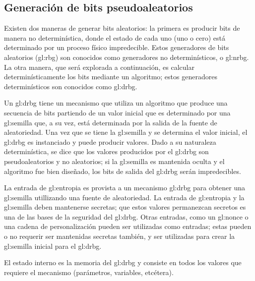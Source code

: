 %
%

\subsection{Generación de bits pseudoaleatorios}
\label{sec:generadores_pseudoaleatorios}

Existen dos maneras de generar bits aleatorios: la primera es producir bits
de manera no determinística, donde el estado de cada uno (uno o cero) está
determinado por un proceso físico impredecible. Estos generadores de bits
aleatorios (\gls{gl:rbg}) son conocidos como generadores no determinísticos, o
\gls{gl:nrbg}. La otra manera, que será explorada a continuación, es calcular
determinísticamente los bits mediante un algoritmo; estos generadores
determinísticos son conocidos como \gls{gl:drbg}.

Un \gls{gl:drbg} tiene un mecanismo que utiliza un algoritmo que produce una
secuencia de bits partiendo de un valor inicial que es determinado por una
\gls{gl:semilla} que, a su vez, está determinada por la salida de la fuente de
aleatoriedad. Una vez que se tiene la \gls{gl:semilla} y se determina el valor
inicial, el \gls{gl:drbg} es instanciado y puede producir valores. Dado a su
naturaleza determinística, se dice que los valores producidos por el
\gls{gl:drbg} son pseudoaleatorios y no aleatorios; si la \gls{gl:semilla} es
mantenida oculta y el algoritmo fue bien diseñado, los bits de salida del
\gls{gl:drbg} serán impredecibles.


La entrada de \gls{gl:entropia} es provista a un mecanismo \gls{gl:drbg} para
obtener una \gls{gl:semilla} utillizando una fuente de aleatoriedad. La entrada
de \gls{gl:entropia} y la \gls{gl:semilla} deben mantenerse secretas; que estos
valores permanezcan secretos es una de las bases de la seguridad del
\gls{gl:drbg}. Otras entradas, como un \gls{gl:nonce} o una cadena de
personalización pueden ser utilizadas como entradas; estas pueden o no requerir
ser mantenidas secretas también, y ser utilizadas para crear la \gls{gl:semilla}
inicial para el \gls{gl:drbg}.

El estado interno es la memoria del \gls{gl:drbg} y consiste en todos los
valores que requiere el mecanismo (parámetros, variables, etcétera).

